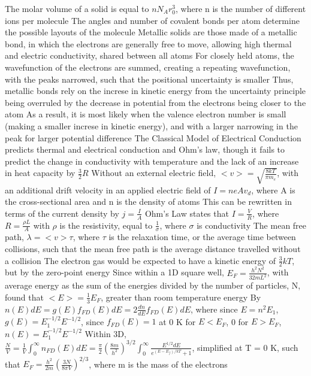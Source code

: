 \documentclass[11 pt, twoside]{article}
\newenvironment{outline*}
{
	\begin{outline}[enumerate]
	}
	{\end{outline}
}
\begin{document}
\begin{outline*}
		\3 The molar volume of a solid is equal to $nN_Ar_0^3$, where n is the number of different ions per molecule
		\3 The angles and number of covalent bonds per atom determine the possible layouts of the molecule
	\2 Metallic solids are those made of a metallic bond, in which the electrons are generally free to move, allowing high thermal and electric conductivity, shared between all atoms
		\3 For closely held atoms, the wavefunction of the electrons are summed, creating a repeating wavefunction, with the peaks narrowed, such that the positional uncertainty is smaller
		\3 Thus, metallic bonds rely on the increse in kinetic energy from the uncertainty principle being overruled by the decrease in potential from the electrons being closer to the atom
			\4 As a result, it is most likely when the valence electron number is small (making a smaller increse in kinetic energy), and with a larger narrowing in the peak for larger potential difference
\1 The Classical Model of Electrical Conduction predicts thermal and electrical conduction and Ohm's law, though it fails to predict the change in conductivity with temperature and the lack of an increase in heat capacity by $\frac{3}{2}R$
	\2 Without an external electric field, $<v> = \sqrt{\frac{8kT}{\pi m_e}}$, with an additional drift velocity in an applied electric field of $I = neAv_d$, where A is the cross-sectional area and n is the density of atoms
		\3 This can be rewritten in terms of the current density by $j = \frac{I}{A}$
		\3 Ohm's Law states that $I = \frac{V}{R}$, where $R = \frac{\rho L}{A}$ with $\rho$ is the resistivity, equal to $\frac{1}{\sigma}$, where $\sigma$ is conductivity
	\2 The mean free path, $\lambda = <v>\tau$, where $\tau$ is the relaxation time, or the average time between collisions, such that the mean free path is the average distance travelled without a collision
\1 The electron gas would be expected to have a kinetic energy of $\frac{3}{2}kT$, but by the zero-point energy
	\2 Since within a 1D square well, $E_F = \frac{h^2N^2}{32mL^2}$, with average energy as the sum of the energies divided by the number of particles, N, found that $<E> = \frac{1}{3}E_F$, greater than room temperature energy
		\3 By $n(E)dE = g(E)f_{FD}(E)dE = 2\frac{dn}{dE}f_{FD}(E)dE$, where since $E = n^2E_1$, $g(E) = E_1^{-1/2}E^{-1/2}$, since $f_{FD}(E) = 1$ at 0 K for $E < E_F$, 0 for $E > E_F$, $n(E) = E_1^{-1/2}E^{-1/2}$
	\2 Within 3D, $\frac{N}{V} = \frac{1}{V}\int^{\infty}_0 n_{FD}(E)dE = \frac{\pi}{2}(\frac{8m}{h^2})^{3/2}\int^{\infty}_0 \frac{E^{1/2}dE}{e^{(E - E_f)/kT} + 1}$, simplified at T = 0 K, such that $E_F = \frac{h^2}{2m}(\frac{3N}{8\pi V})^{2/3}$, where m is the mass of the electrons

\end{outline*}
\end{document}
